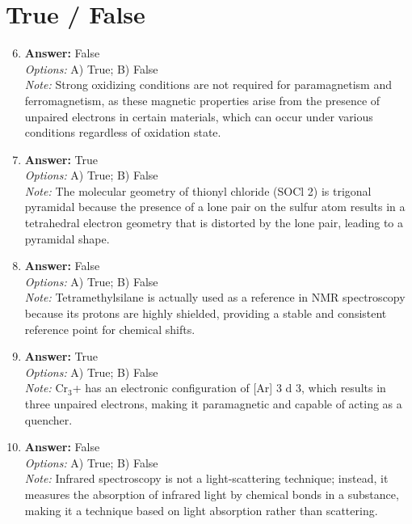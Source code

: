 \documentclass[12pt]{article}
\begin{document}
\section*{True / False}
\begin{enumerate}[label=\arabic*.]
\setcounter{enumi}{5}
\item \textbf{Answer:} False
\\ \textit{Options:} A) True; B) False
\\ \textit{Note:} Strong oxidizing conditions are not required for paramagnetism and ferromagnetism, as these magnetic properties arise from the presence of unpaired electrons in certain materials, which can occur under various conditions regardless of oxidation state.
\item \textbf{Answer:} True
\\ \textit{Options:} A) True; B) False
\\ \textit{Note:} The molecular geometry of thionyl chloride (SOCl 2) is trigonal pyramidal because the presence of a lone pair on the sulfur atom results in a tetrahedral electron geometry that is distorted by the lone pair, leading to a pyramidal shape.
\item \textbf{Answer:} False
\\ \textit{Options:} A) True; B) False
\\ \textit{Note:} Tetramethylsilane is actually used as a reference in NMR spectroscopy because its protons are highly shielded, providing a stable and consistent reference point for chemical shifts.
\item \textbf{Answer:} True
\\ \textit{Options:} A) True; B) False
\\ \textit{Note:} Cr$_{3}$+ has an electronic configuration of [Ar] 3 d 3, which results in three unpaired electrons, making it paramagnetic and capable of acting as a quencher.
\item \textbf{Answer:} False
\\ \textit{Options:} A) True; B) False
\\ \textit{Note:} Infrared spectroscopy is not a light-scattering technique; instead, it measures the absorption of infrared light by chemical bonds in a substance, making it a technique based on light absorption rather than scattering.
\end{enumerate}
\end{document}
